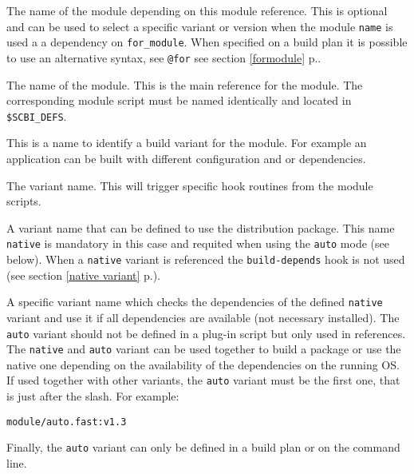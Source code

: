 \documentclass[a4paper,12pt,twoside]{article}
\newcommand{\code}[1]{\texttt{#1}}
\newcommand{\seeref}[1]{see section \ref{#1} p.\pageref{#1}}
\begin{document}
\begin{description}[style=nextline]
	\item[for\_module] The name of the module depending on this module reference. This is optional and can be used to select a specific variant or version when the module \code{name} is used a a dependency on \code{for\_module}. When specified on a build plan it is possible to use an alternative syntax, see \code{@for} \seeref{formodule}.

	\item[name] The name of the module. This is the main reference for the module. The corresponding module script must be named identically and located in \code{\$SCBI\_DEFS}.

	\item[variant] \label{variant}This is a name to identify a build variant for the module. For example an application can be built with different configuration and or dependencies.

	\begin{description}[font=\texttt]
		\item[<ID>] The variant name. This will trigger specific hook routines from the module scripts.

		\item[native] A variant name that can be defined to use the distribution package. This name \code{native} is mandatory in this case and requited when using the \code{auto} mode (see below). When a \code{native} variant is referenced the \code{build-depends} hook is not used (\seeref{native variant}).

		\item[auto] A specific variant name which checks the dependencies of the defined \code{native} variant and use it if all dependencies are available (not necessary installed). The \code{auto} variant should not be defined in a plug-in script but only used in references. The \code{native} and \code{auto} variant can be used together to build a package or use the native one depending on the availability of the dependencies on the running OS. If used together with other variants, the \code{auto} variant must be the first one, that is just after the slash. For example:

		\code{module/auto.fast:v1.3}

		Finally, the \code{auto} variant can only be defined in a build plan or on the command line.
	\end{description}


\end{description}
\end{document}
